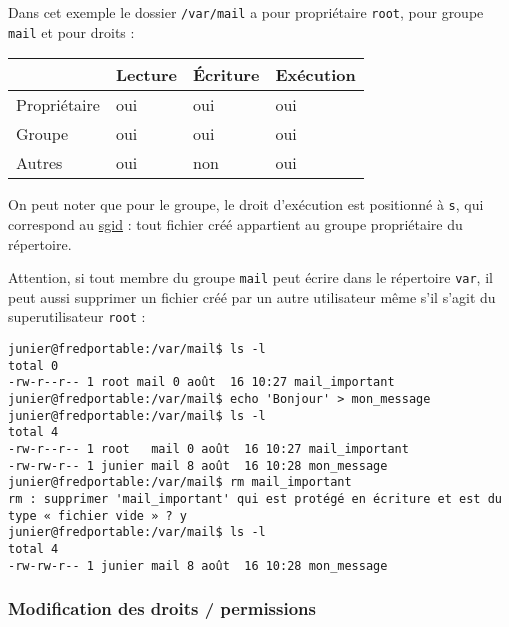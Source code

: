 \documentclass[
  11pt,
]{article}
\newcounter{prop}
\begin{document}
Dans cet exemple le dossier \texttt{/var/mail} a pour propriétaire
\texttt{root}, pour groupe \texttt{mail} et pour droits :

\begin{longtable}[]{@{}llll@{}}
\toprule
& Lecture & Écriture & Exécution\tabularnewline
\midrule
\endhead
Propriétaire & oui & oui & oui\tabularnewline
Groupe & oui & oui & oui\tabularnewline
Autres & oui & non & oui\tabularnewline
\bottomrule
\end{longtable}

On peut noter que pour le groupe, le droit d'exécution est positionné à
\texttt{s}, qui correspond au
\href{https://fr.wikipedia.org/wiki/Permissions_UNIX\#Droit_SGID}{sgid}
: tout fichier créé appartient au groupe propriétaire du répertoire.

Attention, si tout membre du groupe \texttt{mail} peut écrire dans le
répertoire \texttt{var}, il peut aussi supprimer un fichier créé par un
autre utilisateur même s'il s'agit du superutilisateur \texttt{root} :

\begin{verbatim}
junier@fredportable:/var/mail$ ls -l
total 0
-rw-r--r-- 1 root mail 0 août  16 10:27 mail_important
junier@fredportable:/var/mail$ echo 'Bonjour' > mon_message
junier@fredportable:/var/mail$ ls -l
total 4
-rw-r--r-- 1 root   mail 0 août  16 10:27 mail_important
-rw-rw-r-- 1 junier mail 8 août  16 10:28 mon_message
junier@fredportable:/var/mail$ rm mail_important
rm : supprimer 'mail_important' qui est protégé en écriture et est du type « fichier vide » ? y
junier@fredportable:/var/mail$ ls -l
total 4
-rw-rw-r-- 1 junier mail 8 août  16 10:28 mon_message
\end{verbatim}

\hypertarget{modification-des-droits-permissions}{%
\subsubsection{Modification des droits /
permissions}\label{modification-des-droits-permissions}}
\end{document}
